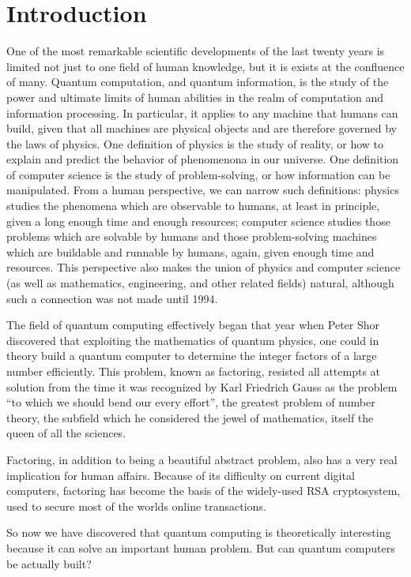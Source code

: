 \chapter{Introduction}
\label{chap:intro}

One of the most remarkable scientific developments of the last twenty years is limited not just to one field of human knowledge, but it is exists at the confluence of many. Quantum computation, and quantum information, is the study of the power and ultimate limits of human abilities in the realm of computation and information processing. In particular, it applies to any machine that humans can build, given that all machines are physical objects and are therefore governed by the laws of physics. One definition of physics is the study of reality, or how to explain and predict the behavior of phenomenona in our universe. One definition of computer science is the study of problem-solving, or how information can be manipulated. From a human perspective, we can narrow such definitions: physics studies the phenomena which are observable to humans, at least in principle, given a long enough time and enough resources; computer science studies those problems which are solvable by humans and those problem-solving machines which are buildable and runnable by humans, again, given enough time and resources. This perspective also makes the union of physics and computer science (as well as mathematics, engineering, and other related fields) natural, although such a connection was not made until 1994.

The field of quantum computing effectively began that year when Peter Shor discovered that exploiting the mathematics of quantum physics, one could in theory build a quantum computer to determine the integer factors of a large number efficiently. This problem, known as factoring, resisted all attempts at solution from the time it was recognized by Karl Friedrich Gauss as the
problem ``to which we should bend our every effort'', the greatest problem of number theory, the subfield which he considered the jewel of mathematics, itself the queen of all the sciences.

Factoring, in addition to being a beautiful abstract problem, also has a very real implication for human affairs. Because of its difficulty on current digital computers, factoring has become the basis of the widely-used RSA cryptosystem, used to secure most of the worlds online transactions.

So now we have discovered that quantum computing is theoretically interesting because it can solve an important human problem. But can quantum computers be actually built?

